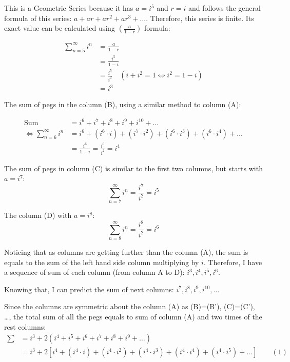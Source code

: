 \documentclass[12pt]{article}
\begin{document}
\noindent This is a Geometric Series because it has $a=i^5$ and $r=i$ and follows the general formula of this series: $a+ar+ar^2+ar^3+\dots$. Therefore, this series is finite. Its exact value can be calculated using $\displaystyle \left(\frac{a}{1-r} \right)$ formula:

\begin{align*}
    \sum_{n=5}^{\infty}i^n &= \frac{a}{1-r}\\
    &= \frac{i^5}{1-i}\\
    &= \frac{i^5}{i^2} \quad\left(i+i^2=1\Longleftrightarrow i^2=1-i\right)\\
    &= i^3
\end{align*}

\noindent The sum of pegs in the column (B), using a similar method to column (A):

\begin{align*}
    \text{Sum} &= i^6+ i^7+ i^8+ i^9+ i^{10}+ \dots\\
    \Longleftrightarrow
    \sum_{n=6}^{\infty}i^n &= i^6+ \left(i^6\cdot i\right)+ \left(i^7\cdot i^2\right)+ \left(i^6\cdot i^3\right)+ \left(i^6\cdot i^4\right)+ \dots\\
    &= \frac{i^6}{1-i} = \frac{i^6}{i^2} = i^4
\end{align*}

    
\noindent The sum of pegs in column (C) is similar to the first two columns, but starts with $a=i^7$:
$$\displaystyle \sum_{n=7}^{\infty}i^n = \frac{i^7}{i^2} = i^5$$
    
\noindent The column (D) with $a=i^8$:
$$\displaystyle \sum_{n=8}^{\infty}i^n = \frac{i^8}{i^2} = i^6$$
    
\noindent Noticing that as columns are getting further than the column (A), the sum is equals to the sum of the left hand side column multiplying by $i$. Therefore, I have a sequence of sum of each column (from column A to D): $i^3, i^4, i^5, i^6$. \par

\noindent Knowing that, I can predict the sum of next columns: $i^7, i^8, i^9, i^{10},\dots $

    
\noindent Since the columns are symmetric about the column (A) as (B)=(B'), (C)=(C'), \dots, the total sum of all the pegs equals to sum of column (A) and two times of the rest columns:
\begin{align*}
    \sum &= i^3+ 2\left(i^4+ i^5+ i^6+ i^7+ i^8+ i^9+ \dots \right)\\
    &= i^3+ 2\left[i^4+ \left(i^4\cdot i\right)+ \left(i^4\cdot i^2\right)+ \left(i^4\cdot i^3\right)+ \left(i^4\cdot i^4\right)+ \left(i^4\cdot i^5\right)+ \dots \right]
    \qquad (1)\\
\end{align*}
    
\end{document}
